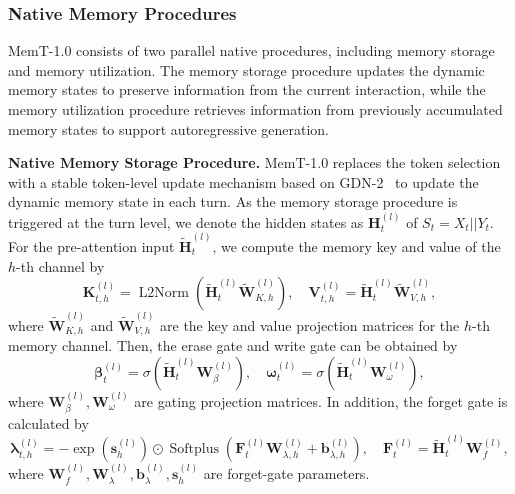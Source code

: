 \subsubsection{Native Memory Procedures}
MemT-1.0 consists of two parallel native procedures, including memory storage and memory utilization.
The memory storage procedure updates the dynamic memory states to preserve information from the current interaction, while the memory utilization procedure retrieves information from previously accumulated memory states to support autoregressive generation.

\textbf{Native Memory Storage Procedure.}
MemT-1.0 replaces the token selection with a stable token-level update mechanism based on GDN-2~\cite{hatamizadeh2026gated} to update the dynamic memory state in each turn.
As the memory storage procedure is triggered at the turn level, we denote the hidden states as $\mathbf{H}^{(l)}_t$ of $S_{t} = X_t||Y_t$.
For the pre-attention input $\tilde{\mathbf{H}}^{(l)}_t$, we compute the memory key and value of the $h$-th channel by
\begin{equation*}
    \mathbf{K}_{t,h}^{(l)} = \operatorname{L2Norm}\left(\tilde{\mathbf{H}}^{(l)}_{t} \tilde{\mathbf{W}}_{K,h}^{(l)}\right), \quad \mathbf{V}_{t,h}^{(l)} = \tilde{\mathbf{H}}^{(l)}_{t} \tilde{\mathbf{W}}_{V,h}^{(l)},
\end{equation*}
where $\tilde{\mathbf{W}}_{K,h}^{(l)}$ and
$\tilde{\mathbf{W}}_{V,h}^{(l)}$ are the key and value projection matrices for the $h$-th memory channel.
Then, the erase gate and write gate can be obtained by
\begin{equation*}
    \bm{\beta}_{t}^{(l)} = \sigma\left( \tilde{\mathbf{H}}^{(l)}_{t} \mathbf{W}_{\beta}^{(l)} \right),
    \quad \bm{\omega}_{t}^{(l)} = \sigma\left( \tilde{\mathbf{H}}^{(l)}_{t} \mathbf{W}_{\omega}^{(l)} \right),
\end{equation*}
where $\mathbf{W}_{\beta}^{(l)}, \mathbf{W}_{\omega}^{(l)}$ are gating projection matrices.
In addition, the forget gate is calculated by
\begin{equation*}
    \bm{\lambda}_{t,h}^{(l)} = - \exp \left(\mathbf{s}^{(l)}_{h} \right) \odot \operatorname{Softplus}\left( \mathbf{F}_{t}^{(l)} \mathbf{W}_{\lambda,h}^{(l)} +\mathbf{b}_{\lambda,h}^{(l)} \right),
    \quad \mathbf{F}_{t}^{(l)} = \tilde{\mathbf{H}}^{(l)}_{t} \mathbf{W}_{f}^{(l)} ,
\end{equation*}
where $\mathbf{W}_{f}^{(l)}, \mathbf{W}_{\lambda}^{(l)}, \mathbf{b}_{\lambda}^{(l)}, \mathbf{s}_h^{(l)}$ are forget-gate parameters.
